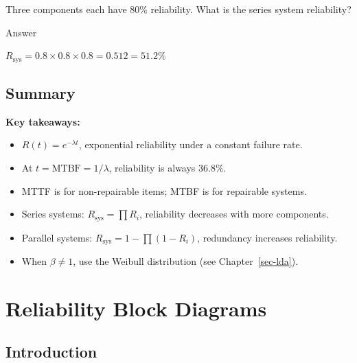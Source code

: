 \documentclass[
  letterpaper,
  DIV=11,
  numbers=noendperiod]{scrreprt}
\providecommand{\tightlist}{%
  \setlength{\itemsep}{0pt}\setlength{\parskip}{0pt}}
\begin{document}
\begin{tcolorbox}[enhanced jigsaw, arc=.35mm, bottomrule=.15mm, bottomtitle=1mm, breakable, colback=white, colbacktitle=quarto-callout-tip-color!10!white, colframe=quarto-callout-tip-color-frame, coltitle=black, left=2mm, leftrule=.75mm, opacityback=0, opacitybacktitle=0.6, rightrule=.15mm, title=\textcolor{quarto-callout-tip-color}{\faLightbulb}\hspace{0.5em}{Review}, titlerule=0mm, toprule=.15mm, toptitle=1mm]

Three components each have 80\% reliability. What is the series system
reliability?

Answer

\(R_{\text{sys}} = 0.8 \times 0.8 \times 0.8 = 0.512 = 51.2\%\)

\end{tcolorbox}

\section{Summary}\label{summary}

\textbf{Key takeaways:}

\begin{itemize}
\tightlist
\item
  \(R(t) = e^{-\lambda t}\), exponential reliability under a constant
  failure rate.
\item
  At \(t = \text{MTBF} = 1/\lambda\), reliability is always 36.8\%.
\item
  MTTF is for non-repairable items; MTBF is for repairable systems.
\item
  Series systems: \(R_{\text{sys}} = \prod R_i\), reliability decreases
  with more components.
\item
  Parallel systems: \(R_{\text{sys}} = 1 - \prod(1 - R_i)\), redundancy
  increases reliability.
\item
  When \(\beta \neq 1\), use the Weibull distribution (see
  Chapter~\ref{sec-lda}).
\end{itemize}


\chapter{Reliability Block Diagrams}\label{sec-rbd}

\section{Introduction}\label{introduction-1}
\end{document}
